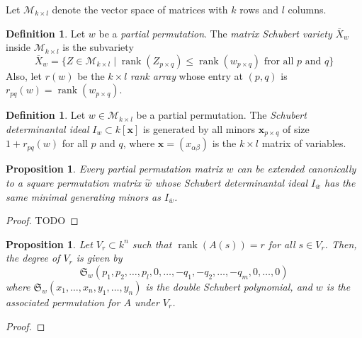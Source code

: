 \documentclass{amsart}
\newtheorem{proposition}[theorem]{Proposition}
\theoremstyle{definition}
\newtheorem{definition}[theorem]{Definition}
\theoremstyle{remark}
\DeclareMathOperator{\rank}{rank}
\numberwithin{equation}{section}
\begin{document}
Let $\mathcal{M}_{k \times l}$ denote the vector space of matrices with $k$ rows and $l$ columns.

\begin{definition}
  Let $w$ be a \emph{partial permutation}. The \emph{matrix Schubert variety} $\overline{X}_w$ inside $\mathcal{M}_{k \times l}$ is the subvariety
  \begin{equation*}
    \overline{X}_w = \{ Z \in \mathcal{M}_{k \times l} \mid \rank(Z_{p \times q}) \leq \rank(w_{p \times q}) \text{ fror all $p$ and $q$} \}
  \end{equation*}
  Also, let $r(w)$ be the $k \times l$ \emph{rank array} whose entry at $(p, q)$ is $r_{pq}(w) = \rank(w_{p \times q})$.
\end{definition}

\begin{definition}
  Let $w \in \mathcal{M}_{k \times l}$ be a partial permutation. The \emph{Schubert determinantal ideal} $I_w \subset k[\mathbf{x}]$ is generated by all minors $\mathbf{x}_{p \times q}$ of size $1 + r_{pq}(w)$ for all $p$ and $q$, where $\mathbf{x} = (x_{\alpha\beta})$ is the $k \times l$ matrix of variables.
\end{definition}

\begin{proposition}
  Every partial permutation matrix $w$ can be extended canonically to a square permutation matrix $\overset{\sim}{w}$ whose Schubert determinantal ideal $I_{\overline{w}}$ has the same minimal generating minors as $I_{\overline{w}}$.
\end{proposition}

\begin{proof}
  TODO
\end{proof}

\begin{proposition}
  Let $V_r \subset k^n$ such that $\rank(A(s)) = r$ for all $s \in V_r$. Then, the degree of $V_r$ is given by
  \begin{equation*}
    \mathfrak{S}_w(p_1, p_2, \ldots, p_l, 0, \ldots, -q_1, -q_2, \ldots, -q_m, 0, \ldots, 0)
  \end{equation*}
  where $\mathfrak{S}_w(x_1, \ldots, x_n, y_1, \ldots, y_n)$ is the double Schubert polynomial, and $w$ is the associated permutation for $A$ under $V_r$.
\end{proposition}

\begin{proof}
\end{proof}
\end{document}
